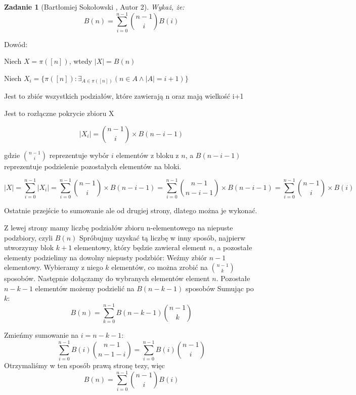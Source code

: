 \documentclass{mwart}
\newtheorem{zad}{Zadanie}[section]
\begin{document}
\begin{zad}[Bartłomiej Sokołowski , Autor 2]
    Wykaż, że:
    \[B(n) = \sum_{i=0}^{n-1} \binom{n-1}{i}B(i)\]
\end{zad}
\begin{mdframed}
    \item Dowód:
    \item Niech $X = \pi([n])$, wtedy $|X| = B(n)$
    \item Niech $X_i = \{\pi([n]) : \exists_{A \in \pi([n])} (n \in A \land |A| = i + 1)\}$
    \item Jest to zbiór wszystkich podziałów, które zawierają n oraz mają wielkość i+1
    \item Jest to rozłączne pokrycie zbioru X
    \item \[ |X_i| = \binom{n-1}{i} \times B(n-i-1)\]
    \item gdzie $\binom{n-1}{i}$ reprezentuje wybór $i$ elementów z bloku z $n$, a $B(n-i-1)$ reprezentuje podzielenie pozostałych elementów na bloki.
    \item \[ |X| = \sum_{i=0}^{n-1} |X_i| = \sum_{i=0}^{n-1}\binom{n-1}{i} \times B(n-i-1) = \sum_{i=0}^{n-1} \binom{n-1}{n-i-1} \times B(n-i-1) = \sum_{i=0}^{n-1} \binom{n-1}{i} \times B(i)\]
    \item Ostatnie przejście to sumowanie ale od drugiej strony, dlatego można je wykonać.
\end{mdframed}
\begin{mdframed}
    Z lewej strony mamy liczbę podziałów zbioru n-elementowego na niepuste podzbiory, czyli $B(n)$
    \newline \newline
    Spróbujmy uzyskać tą liczbę w inny sposób, najpierw utworzymy blok $k+1$ elementowy, który będzie
    zawierał element $n$, a pozostałe elementy podzielimy na dowolny niepusty podzbiór:
    \newline \newline
    Weźmy zbiór $n-1$ elementowy. Wybieramy z niego $k$ elementów, co można zrobić na $\binom{n-1}{k}$
    sposobów. Następnie dołączamy do wybranych elementów element $n$. Pozostałe $n-k-1$ elementów
    możemy podzielić na $B(n-k-1)$ sposobów
    \newline
    Sumując po $k$:
    \newline \newline
    \[B(n) = \sum_{k=0}^{n-1}B{(n-k-1)}\binom{n-1}{k} \]

    Zmieńmy sumowanie na $i=n-k-1$:
    \[\sum_{i=0}^{n-1}B(i)\binom{n-1}{n-1-i} = \sum_{i=0}^{n-1}B(i)\binom{n-1}{i} \]
    \newline
    Otrzymaliśmy w ten sposób prawą stronę tezy, więc
    \newline
    \[B(n) = \sum_{i=0}^{n-1} \binom{n-1}{i}B(i)\]
\end{mdframed}
\end{document}
